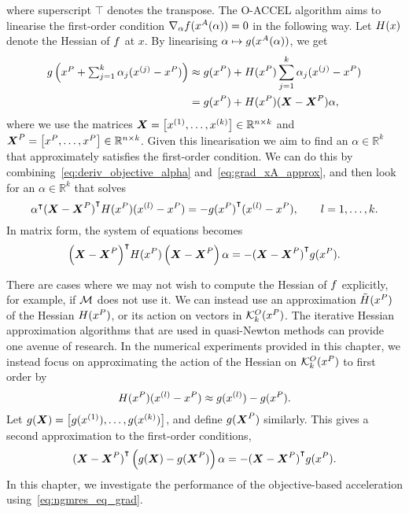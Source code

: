 \documentclass[main.tex]{subfiles}
\begin{document}
where superscript $\intercal$ denotes the transpose.  The O-ACCEL
algorithm aims to linearise the first-order condition
$\nabla_\alpha f(x^A(\alpha))=0$ in the following way. Let
$H(x)$ denote the Hessian of $f$ at $x$. By linearising
$\alpha\mapsto\nobreak g(x^A(\alpha))$, we get
\begin{align}\label{eq:grad_xA_approx}
  \begin{split}
    g\left({\textstyle
        x^P+\sum_{j=1}^k\alpha_j(x^{(j)}-x^P)}\right) &\approx
    g(x^P) + H(x^P)
    \sum_{j=1}^k\alpha_j(x^{(j)}-x^P)\\
    &= g(x^P) +H(x^P)(\boldsymbol{X}-\boldsymbol{X}^P)\alpha,
  \end{split}
\end{align}
where we use the matrices
$\boldsymbol{X} = \left[x^{(1)},\dots,x^{(k)}\right]\in\mathbb{R}^{n\times
  k}$ and
$\boldsymbol{X}^P = \left[x^P,\dots,x^P\right]\in\mathbb{R}^{n\times k}$.
Given this linearisation we aim to find an $\alpha\in\mathbb{R}^k$
that approximately satisfies the first-order
condition. %
We can do this by combining~\eqref{eq:deriv_objective_alpha}
and~\eqref{eq:grad_xA_approx}, and then look for an
$\alpha\in\mathbb{R}^k$ that solves
\begin{equation}
  \alpha^\intercal{(\boldsymbol{X}-\boldsymbol{X}^P)}^\intercal H(x^P)
  (x^{(l)}-x^P) = -{g(x^P)}^\intercal(x^{(l)}-x^P),\qquad l=1,\dots,k.
\end{equation}
In matrix form, the system of equations becomes
\begin{equation}\label{eq:ngmres_eq_hess}
  {\left(\boldsymbol{X}-\boldsymbol{X}^P\right)}^\intercal H(x^P)
  \left(\boldsymbol{X}-\boldsymbol{X}^P\right)
  \alpha
  = -{(\boldsymbol{X}-\boldsymbol{X}^P)}^\intercal{g(x^P)}.
\end{equation}

There are cases where we may not wish to compute the Hessian of $f$
explicitly, for example, if $\mathcal{M}$ does not use it.  We can instead
use an approximation $\tilde{H}(x^P)$ of the Hessian
$H(x^P)$, or its action on vectors in $\mathcal{K}_{k}^O(x^P)$.  The
iterative Hessian approximation algorithms that are used in
quasi-Newton methods can provide one avenue of research.  In the
numerical experiments provided in this chapter, we instead focus on
approximating the action of the Hessian on $\mathcal{K}_{k}^O(x^P)$ to first
order by
\begin{equation}\label{eq:approx_hess}
  H(x^P) (x^{(l)}-x^P)
  \approx g(x^{(l)})-g(x^P).
\end{equation}
Let
$g(\boldsymbol{X}) = \left[g(x^{(1)}),\dots,g(x^{(k)})\right]$,
and define $g(\boldsymbol{X}^P)$ similarly.  This gives a second
approximation to the first-order conditions,
\begin{equation}\label{eq:ngmres_eq_grad}
  {(\boldsymbol{X}-\boldsymbol{X}^P)}^\intercal\left(
    g(\boldsymbol{X})-g(\boldsymbol{X}^P)
  \right)
  \alpha
  = -{(\boldsymbol{X}-\boldsymbol{X}^P)}^\intercal{g(x^P)}.
\end{equation}
In this chapter, we investigate the performance of the
objective-based acceleration using~\eqref{eq:ngmres_eq_grad}.
\end{document}
